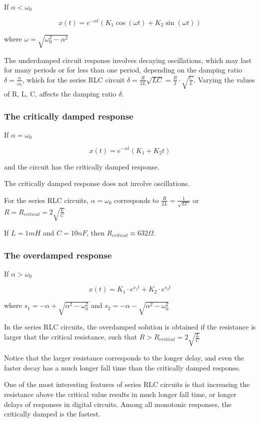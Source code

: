 \documentclass{article}
\begin{document}
If $\alpha<\omega_0$

$$x(t)=e^{-\alpha t}(K_1\cos(\omega t)+K_2\sin(\omega t))$$

where $\omega=\sqrt{\omega_0^2-\alpha^2}$

The underdamped circuit response involves decaying oscillations, which may
last for many periods or for less than one period, depending on the damping
ratio $\delta=\frac{\alpha}{\omega_0}$, which for the series RLC circuit 
$\delta=\frac{R}{2L}\sqrt{LC}=\frac{R}{2}\cdot\sqrt{\frac{C}{L}}$. Varying 
the values of R, L, C, affects the damping ratio $\delta$.

\subsubsection{The critically damped response}

If $\alpha=\omega_0$

$$x(t)=e^{-\alpha t}(K_1+K_2t)$$

and the circuit has the critically damped response.

The critically damped response does not involve oscillations.

For the series RLC circuits, $\alpha=\omega_0$ corresponds to $\frac{R}{2L}=\frac{1}{\sqrt{LC}}$ or $R=R_{critical}=2\sqrt{\frac{L}{C}}$

If $L = 1mH$ and $C = 10nF$, then $R_{critical} \approx 632 \Omega$.

\subsubsection{The overdamped response}

If $\alpha>\omega_0$

$$x(t)=K_1\cdot e^{s_1t}+K_2\cdot e^{s_2t}$$

where $s_1=-\alpha+\sqrt{\alpha^2-\omega_0^2}$ and $s_2=-\alpha-\sqrt{\alpha^2-\omega_0^2}$

In the series RLC circuits, the overdamped solution is obtained if the resistance is larger that the critical resistance, such that $R>R_{critical}=2\sqrt{\frac{L}{C}}$

Notice that the larger resistance corresponds to the longer delay, and even
the faster decay has a much longer fall time than the critically damped response.

One of the most interesting features of series RLC circuits is that increasing
the resistance above the critical value results in much longer fall time, or longer
delays of responses in digital circuits. Among all monotonic responses, the
critically damped is the fastest.
\end{document}
